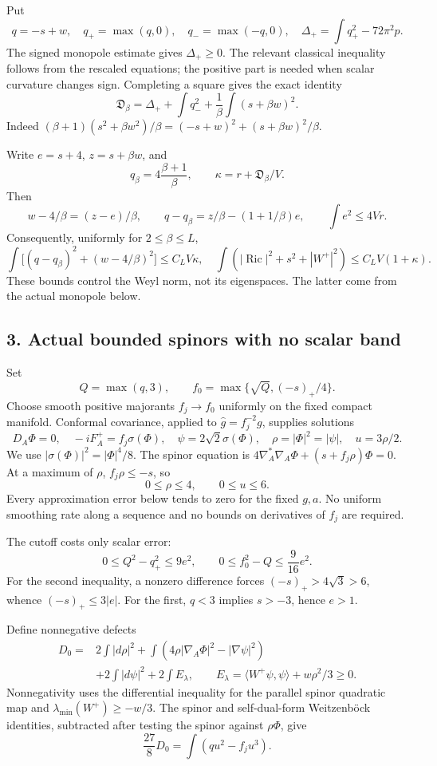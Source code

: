 \documentclass[
  10pt,
]{article}
\begin{document}
Put \[
q=-s+w,\quad q_+=\max(q,0),\quad q_-=\max(-q,0),\quad
\Delta_+=\int q_+^2-72\pi^2p.
\] The signed monopole estimate gives \(\Delta_+\ge0\). The relevant
classical inequality follows from the rescaled equations; the positive
part is needed when scalar curvature changes sign. Completing a square
gives the exact identity \[
\boxed{
\mathfrak D_\beta
=\Delta_++\int q_-^2+\frac1\beta\int(s+\beta w)^2.
}
\tag{5}
\] Indeed
\((\beta+1)(s^2+\beta w^2)/\beta =(-s+w)^2+(s+\beta w)^2/\beta\).

Write \(e=s+4\), \(z=s+\beta w\), and \[
q_\beta=4\frac{\beta+1}{\beta},\qquad
\kappa=r+\mathfrak D_\beta/V.
\] Then \[
w-4/\beta=(z-e)/\beta,\qquad
q-q_\beta=z/\beta-(1+1/\beta)e,\qquad
\int e^2\le4Vr.
\tag{6}
\] Consequently, uniformly for \(2\le\beta\le L\), \[
\int\bigl[(q-q_\beta)^2+(w-4/\beta)^2\bigr]
\le C_L V\kappa,
\quad
\int(|\operatorname{Ric}|^2+s^2+|W^+|^2)
\le C_L V(1+\kappa).
\tag{7}
\] These bounds control the Weyl norm, not its eigenspaces. The latter
come from the actual monopole below.

\hypertarget{actual-bounded-spinors-with-no-scalar-band}{%
\subsection{3. Actual bounded spinors with no scalar
band}\label{actual-bounded-spinors-with-no-scalar-band}}

Set \[
Q=\max(q,3),\qquad
f_0=\max\{\sqrt Q,(-s)_+/4\}.
\] Choose smooth positive majorants \(f_j\to f_0\) uniformly on the
fixed compact manifold. Conformal covariance, applied to
\(\widehat g=f_j^{-2}g\), supplies solutions \[
D_A\Phi=0,\quad -iF_A^+=f_j\sigma(\Phi),\quad
\psi=2\sqrt2\sigma(\Phi),\quad
\rho=|\Phi|^2=|\psi|,\quad u=3\rho/2.
\tag{8}
\] We use \(|\sigma(\Phi)|^2=|\Phi|^4/8\). The spinor equation is
\(4\nabla_A^*\nabla_A\Phi+(s+f_j\rho)\Phi=0\). At a maximum of \(\rho\),
\(f_j\rho\le-s\), so \[
0\le\rho\le4,\qquad 0\le u\le6.
\tag{9}
\] Every approximation error below tends to zero for the fixed \(g,a\).
No uniform smoothing rate along a sequence and no bounds on derivatives
of \(f_j\) are required.

The cutoff costs only scalar error: \[
0\le Q^2-q_+^2\le9e^2,\qquad
0\le f_0^2-Q\le\frac9{16}e^2.
\tag{10}
\] For the second inequality, a nonzero difference forces
\((-s)_+>4\sqrt3>6\), whence \((-s)_+\le3|e|\). For the first, \(q<3\)
implies \(s>-3\), hence \(e>1\).

Define nonnegative defects \[
\begin{aligned}
D_0={}&2\int|d\rho|^2
+\int(4\rho|\nabla_A\Phi|^2-|\nabla\psi|^2)\\
&+2\int|d\psi|^2+2\int E_\lambda,\qquad
E_\lambda=\langle W^+\psi,\psi\rangle+w\rho^2/3\ge0.
\end{aligned}
\tag{11}
\] Nonnegativity uses the differential inequality for the parallel
spinor quadratic map and \(\lambda_{\min}(W^+)\ge-w/3\). The spinor and
self-dual-form Weitzenböck identities, subtracted after testing the
spinor against \(\rho\Phi\), give \[
\frac{27}{8}D_0=\int(qu^2-f_j u^3).
\tag{12}
\]
\end{document}
